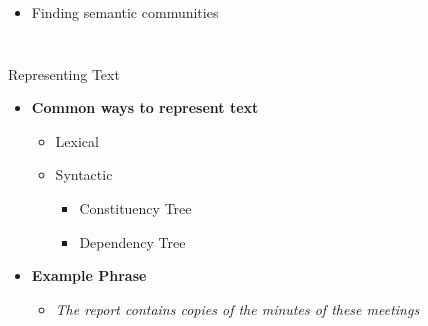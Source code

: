 \documentclass[10pt,=table]{beamer}
\begin{document}
\begin{frame}
\begin{columns}
\begin{minipage}[c][0.5\textheight][c]{\linewidth}
	\begin{itemize}
		\item[] Finding \textcolor{orangeEric}{semantic communities}
	\end{itemize}	
	\end{minipage}	
\end{columns}

\vspace{\textheight}

\end{frame}

\begin{frame}{Representing Text}

\begin{itemize}
	\item \textbf{Common ways to represent text}
	\begin{itemize}
		\item Lexical
		\item Syntactic
		\begin{itemize}
				\item Constituency Tree
				\item Dependency Tree
		\end{itemize}
	\end{itemize}
	 \item \textbf{Example Phrase}
	\begin{itemize}
		\item[] \textit{The report contains copies of the minutes of these meetings}
	\end{itemize}
\end{itemize}

\begin{overprint}
  				

\end{overprint}
\end{frame}
\end{document}
